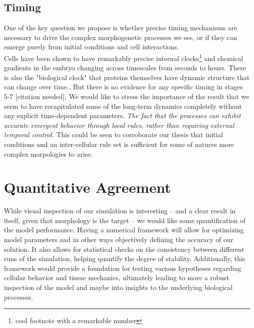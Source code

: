 

\subsection{Timing}
One of the key question we propose is whether precise timing mechanisms are necessary to drive the complex morphogenetic processes we see, or if they can emerge purely from initial conditions and cell interactions.\\
Cells have been shown to have remarkably precise internal clocks\footnote{cool footnote with a remarkable number\cite{cellinternal}} and chemical gradients in the embryo changing across timescales from seconds to hours\cite{shvartsman2008dynamics}. There is also the "biological clock"\cite{johanolsen2} that proteins themselves have dynamic structure that can change over time.\cite{johanolsen1}. But there is no evidence for any specific timing in stages 5-7 [citation needed]. We would like to stress the importance of the result that we seem to have recapitulated some of the long-term dynamics completely without any explicit time-dependent parameters. \textit{The fact  that the processes can exhibit accurate emergent behavior through local rules, rather than requiring external temporal control. }This could be seen to corroborate our thesis that initial conditions and an inter-cellular rule set is sufficient for some of natures more complex morpologies to arise. 
\newpage
\section{Quantitative Agreement}

While visual inspection of our simulation is interesting -- and a clear result in itself, given that morphology is the target -- we would like some quantification of the model performance. Having a numerical framework will allow for optimizing model parameters and in other ways objectively defining the accuracy of our solution. It also allows for statistical checks on the consistency between different runs of the simulation, helping quantify the degree of stability. Additionally, this framework would provide a foundation for testing various hypotheses regarding cellular behavior and tissue mechanics, ultimately leading to more a robust inspection of the model and maybe into insights to the underlying biological processes.\\


